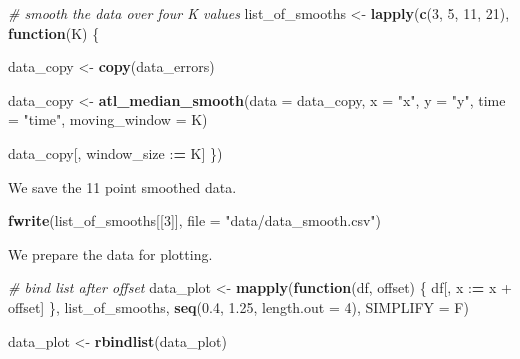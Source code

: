 \documentclass[
]{scrreprt}
\newenvironment{Shaded}{}{}
\newcommand{\CommentTok}[1]{\textcolor[rgb]{0.38,0.63,0.69}{\textit{#1}}}
\newcommand{\ControlFlowTok}[1]{\textcolor[rgb]{0.00,0.44,0.13}{\textbf{#1}}}
\newcommand{\DataTypeTok}[1]{\textcolor[rgb]{0.56,0.13,0.00}{#1}}
\newcommand{\DecValTok}[1]{\textcolor[rgb]{0.25,0.63,0.44}{#1}}
\newcommand{\ErrorTok}[1]{\textcolor[rgb]{1.00,0.00,0.00}{\textbf{#1}}}
\newcommand{\FloatTok}[1]{\textcolor[rgb]{0.25,0.63,0.44}{#1}}
\newcommand{\KeywordTok}[1]{\textcolor[rgb]{0.00,0.44,0.13}{\textbf{#1}}}
\newcommand{\NormalTok}[1]{#1}
\newcommand{\OperatorTok}[1]{\textcolor[rgb]{0.40,0.40,0.40}{#1}}
\newcommand{\StringTok}[1]{\textcolor[rgb]{0.25,0.44,0.63}{#1}}
\begin{document}
\begin{Shaded}
\begin{Highlighting}[]
\CommentTok{\# smooth the data over four K values}
\NormalTok{list\_of\_smooths <{-}}\StringTok{ }\KeywordTok{lapply}\NormalTok{(}\KeywordTok{c}\NormalTok{(}\DecValTok{3}\NormalTok{, }\DecValTok{5}\NormalTok{, }\DecValTok{11}\NormalTok{, }\DecValTok{21}\NormalTok{), }\ControlFlowTok{function}\NormalTok{(K) \{}
  
\NormalTok{  data\_copy <{-}}\StringTok{ }\KeywordTok{copy}\NormalTok{(data\_errors)}
  
\NormalTok{  data\_copy <{-}}\StringTok{ }\KeywordTok{atl\_median\_smooth}\NormalTok{(}\DataTypeTok{data =}\NormalTok{ data\_copy,}
                    \DataTypeTok{x =} \StringTok{"x"}\NormalTok{, }
                    \DataTypeTok{y =} \StringTok{"y"}\NormalTok{,}
                    \DataTypeTok{time =} \StringTok{"time"}\NormalTok{,}
                    \DataTypeTok{moving\_window =}\NormalTok{ K)}
  
\NormalTok{  data\_copy[, window\_size }\OperatorTok{:}\ErrorTok{=}\StringTok{ }\NormalTok{K]}
\NormalTok{\})}
\end{Highlighting}
\end{Shaded}

We save the 11 point smoothed data.

\begin{Shaded}
\begin{Highlighting}[]
\KeywordTok{fwrite}\NormalTok{(list\_of\_smooths[[}\DecValTok{3}\NormalTok{]], }\DataTypeTok{file =} \StringTok{"data/data\_smooth.csv"}\NormalTok{)}
\end{Highlighting}
\end{Shaded}

We prepare the data for plotting.

\begin{Shaded}
\begin{Highlighting}[]
\CommentTok{\# bind list after offset}
\NormalTok{data\_plot <{-}}\StringTok{ }\KeywordTok{mapply}\NormalTok{(}\ControlFlowTok{function}\NormalTok{(df, offset) \{}
\NormalTok{  df[, x }\OperatorTok{:}\ErrorTok{=}\StringTok{ }\NormalTok{x }\OperatorTok{+}\StringTok{ }\NormalTok{offset]}
\NormalTok{\}, list\_of\_smooths, }\KeywordTok{seq}\NormalTok{(}\FloatTok{0.4}\NormalTok{, }\FloatTok{1.25}\NormalTok{, }\DataTypeTok{length.out =} \DecValTok{4}\NormalTok{),}
\DataTypeTok{SIMPLIFY =}\NormalTok{ F)}

\NormalTok{data\_plot <{-}}\StringTok{ }\KeywordTok{rbindlist}\NormalTok{(data\_plot)}
\end{Highlighting}
\end{Shaded}
\end{document}

